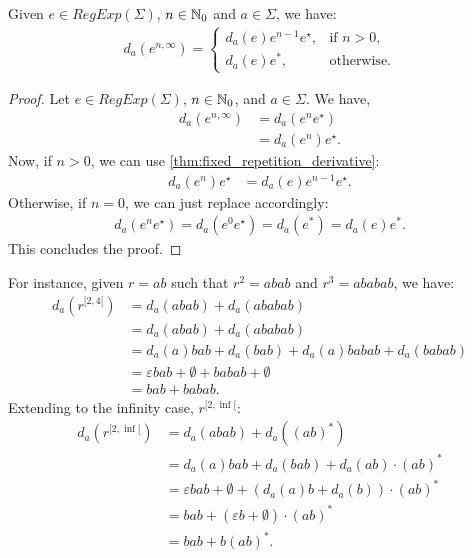 \begin{thm}
	Given $e \in RegExp(\Sigma)$, $n \in {\mathbb{N}_{0}}$ and $a \in \Sigma$, we have:
	\begin{align*}
		d_a(e^{n,\infty}) =
		\begin{cases}
			d_a(e)e^{n-1}e^\star, & \text{if } n>0, \\
			d_a(e)e^*, & \text{otherwise}.
		\end{cases}
	\end{align*}
\end{thm}
\begin{proof}
	Let $e \in RegExp(\Sigma)$, $n \in {\mathbb{N}_{0}}$, and $a \in \Sigma$. We have,
	\begin{align*}
		d_a(e^{n,\infty}) &= d_a(e^ne^\star) \\
		&= d_a(e^n)e^\star. %
	\end{align*}
	Now, if $n>0$, we can use \ref{thm:fixed_repetition_derivative}:
	\begin{align*}
		d_a(e^n)e^\star &= d_a(e)e^{n-1}e^\star.
	\end{align*}
	Otherwise, if $n=0$, we can just replace accordingly:
	\begin{align*}
		d_a(e^ne^\star) = d_a(e^0e^\star) = d_a(e^*) = d_a(e)e^*.
	\end{align*}
	This concludes the proof.
\end{proof}
For instance, given $r = ab$ such that $r^2 = abab$ and $r^3 = ababab$, we have:
\begin{align*}
	d_a(r^{[2,4[}) &= d_a(abab) + d_a(ababab) \\
	&= d_a(abab) + d_a(ababab) \\
	&= d_a(a)bab + d_a(bab) + d_a(a)babab + d_a(babab) \\
	&= \varepsilon bab + \emptyset + babab + \emptyset \\
	&= bab + babab.
\end{align*}
Extending to the infinity case, $r^{[2, \inf[}$:
\begin{align*}
	d_a(r^{[2,\inf[}) &= d_a(abab) + d_a((ab)^*) \\
	&= d_a(a)bab + d_a(bab) + d_a(ab)\cdot(ab)^* \\
	&= \varepsilon bab + \emptyset + (d_a(a)b + d_a(b)) \cdot (ab)^* \\
	&= bab + (\varepsilon b + \emptyset) \cdot (ab)^* \\
	&= bab + b(ab)^*.
\end{align*}

